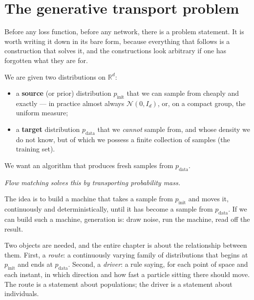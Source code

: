 \documentclass[11pt,a4paper]{report}
\theoremstyle{definition}
\theoremstyle{remark}
\newcommand{\RR}{\mathbb R}
\begin{document}
\section{The generative transport problem}
\label{sec:fm-transport}

Before any loss function, before any network, there is a problem statement.
It is worth writing it down in its bare form, because everything that
follows is a construction that solves it, and the constructions look
arbitrary if one has forgotten what they are for.

We are given two distributions on $\RR^d$:

\begin{itemize}
\item a \textbf{source} (or prior) distribution $p_{\mathrm{init}}$ that we
      can sample from cheaply and exactly --- in practice almost always
      $\mathcal N(0,I_d)$, or, on a compact group, the uniform measure;
\item a \textbf{target} distribution $p_{\mathrm{data}}$ that we
      \emph{cannot} sample from, and whose density we do not know, but of
      which we possess a finite collection of samples (the training set).
\end{itemize}

We want an algorithm that produces fresh samples from $p_{\mathrm{data}}$.

\begin{center}
\emph{Flow matching solves this by transporting probability mass.}
\end{center}

The idea is to build a machine that takes a sample from
$p_{\mathrm{init}}$ and moves it, continuously and deterministically, until
it has become a sample from $p_{\mathrm{data}}$. If we can build such a
machine, generation is: draw noise, run the machine, read off the result.

Two objects are needed, and the entire chapter is about the relationship
between them. First, a \emph{route}: a continuously varying family of
distributions that begins at $p_{\mathrm{init}}$ and ends at
$p_{\mathrm{data}}$. Second, a \emph{driver}: a rule saying, for each
point of space and each instant, in which direction and how fast a particle
sitting there should move. The route is a statement about populations; the
driver is a statement about individuals.
\end{document}
